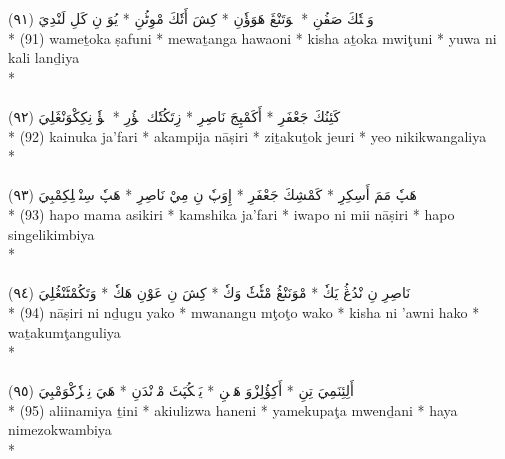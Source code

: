 \documentclass[a4paper, 12pt]{report}
\begin{document}
\begin{center}
\textarabic{(٩١) \textcolor{mygreen}{وَمٖتٗكَ صَفُنِ  * مٖوَتَنْڠَ هَوَؤٗنِ  * كِشَ أَتٗكَ مْوِٹُنِ  * يُوَ نِ كَلِ لَنْدِيَ }} \\* 
(91) wameṯoka ṣafuni  * mewaṯanga hawaoni  * kisha aṯoka mwiţuni  * yuwa ni kali lanḏiya  \\* 
 \\ 
\\[8mm] 

\textarabic{(٩٢) \textcolor{mygreen}{كَئِنُكَ جَعْفَرِ  * أَكَمْپِجَ نَاصِرِ  * زِتَكُتٗك جٖؤُرِ  * يٖؤٗ نِكِكْوَنْڠَلِيَ }} \\* 
(92) kainuka ja'fari  * akampija nāṣiri  * ziṯakuṯok jeuri  * yeo nikikwangaliya  \\* 
 \\ 
\\[8mm] 

\textarabic{(٩٣) \textcolor{mygreen}{هَپٗ مَمَ أَسِكِرِ  * كَمْشِكَ جَعْفَرِ  * إِوَپٗ نِ مِيْ نَاصِرِ  * هَپٗ سِنْڠٖلِكِمْبِيَ }} \\* 
(93) hapo mama asikiri  * kamshika ja'fari  * iwapo ni mii nāṣiri  * hapo singelikimbiya  \\* 
 \\ 
\\[8mm] 

\textarabic{(٩٤) \textcolor{mygreen}{نَاصِرِ نِ نْدُڠُ يَكٗ  * مْوَنَنْڠُ مْٹٗٹٗ وَكٗ  * كِشَ نِ عَوْنِ هَكٗ  * وَتَكُمْٹَنْڠُلِيَ }} \\* 
(94) nāṣiri ni nḏugu yako  * mwanangu mţoţo wako  * kisha ni 'awni hako  * waṯakumţanguliya  \\* 
 \\ 
\\[8mm] 

\textarabic{(٩٥) \textcolor{mygreen}{أَلِئِنَمِيَ تِنِ  * أَكِؤُلِزْوَ هَنٖنِ  * يَمٖكُپَٹَ مْوٖنْدَنِ  * هَيَ نِمٖزٗكْوَمْبِيَ }} \\* 
(95) aliinamiya ṯini  * akiulizwa haneni  * yamekupaţa mwenḏani  * haya nimezokwambiya  \\* 
 \\ 
\\[8mm] 


\end{center}
\end{document}
